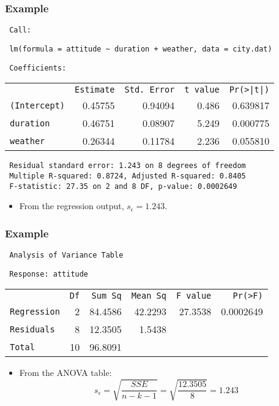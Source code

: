 \documentclass[14pt]{beamer}
\begin{document}
\begin{frame}
	\frametitle{Example}
	
	{\footnotesize
		{\tt\ Call:}\\
		\vspace{2mm}
		
	{\tt\ lm(formula = attitude \textasciitilde{} duration + weather, data = city.dat)}
	
	\vspace{2mm}
	{\tt\ Coefficients:}
	\begin{center}
		\begin{tabular}{lrrrr}
			& {\tt Estimate} & {\tt Std. Error} & {\tt t value} & {\tt Pr(>|t|)} \\
			{\tt (Intercept)} & 0.45755 & 0.94094 & 0.486 & 0.639817 \\
			{\tt duration} & 0.46751 & 0.08907 & 5.249 & 0.000775 \\
			{\tt weather} & 0.26344 & 0.11784 & 2.236 & 0.055810 \\
		\end{tabular}
	\end{center}
	
	{\color{red}\tt\ Residual standard error: 1.243 on 8 degrees of freedom}\\
	{\tt\ Multiple R-squared: 0.8724, Adjusted R-squared: 0.8405}\\
	{\tt\ F-statistic: 27.35 on 2 and 8 DF, p-value: 0.0002649}}
		\vspace{2mm}
		
	\begin{itemize}[label={\color{blue}$\blacktriangleright$}]
		\item From the regression output, $s_\epsilon = 1.243$.
	\end{itemize}
	
\end{frame}
\begin{frame}
	\frametitle{Example}
	
	{\small
		{\tt\ Analysis of Variance Table}
	\vspace{2mm}
	
	{\tt\ Response: attitude}
	\begin{center}
		\begin{tabular}{lrrrrr}
			& {\tt Df} & {\tt Sum Sq} & {\tt Mean Sq} & {\tt F value} & {\tt Pr(>F)} \\
			{\tt Regression} & 2 & 84.4586 & 42.2293 & 27.3538 & 0.0002649 \\
			{\tt Residuals} & {\color{red}8} & {\color{red}12.3505} & 1.5438 & & \\
			{\tt Total} & 10 & 96.8091 & & & \\
		\end{tabular}
	\end{center}}
	\vspace{2mm}
	
	\begin{itemize}[label={\color{blue}$\blacktriangleright$}]
		\item From the ANOVA table:
		\[
		s_\epsilon = \sqrt{\frac{SSE}{n-k-1}} = \sqrt{\frac{12.3505}{8}} = 1.243
		\]
	\end{itemize}
	
\end{frame}
\end{document}
